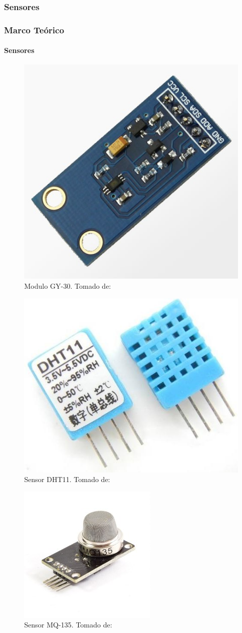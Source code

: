 \subsubsection{Sensores}
\begin{frame}
\frametitle{Marco Teórico}
\framesubtitle{Sensores}

\begin{multicols}{3}
	
	\begin{figure}[!]
			\centering
			\caption{\tiny Modulo GY-30. Tomado de: \cite{GY30}}
			\label{fig:gy-30}
			\includegraphics[width=0.4\linewidth]{Imagenes/gy-30}
	\end{figure}
	
	\begin{figure}[!]
		\centering
		\caption{\tiny Sensor DHT11. Tomado de: \cite{DHT11}}
		\label{fig:dht11}
		\includegraphics[width=0.4\linewidth]{Imagenes/dht11}
	\end{figure}
	
	
	\begin{figure}[!]
		\centering
		\caption{\tiny Sensor MQ-135. Tomado de: \cite{MQ1}}
		\label{fig:sensor-calidad-aire-mq135}
	 	\includegraphics[width=0.3\linewidth]{Imagenes/sensor-calidad-aire-mq135}
	\end{figure}
	

\end{multicols}
\end{frame}
